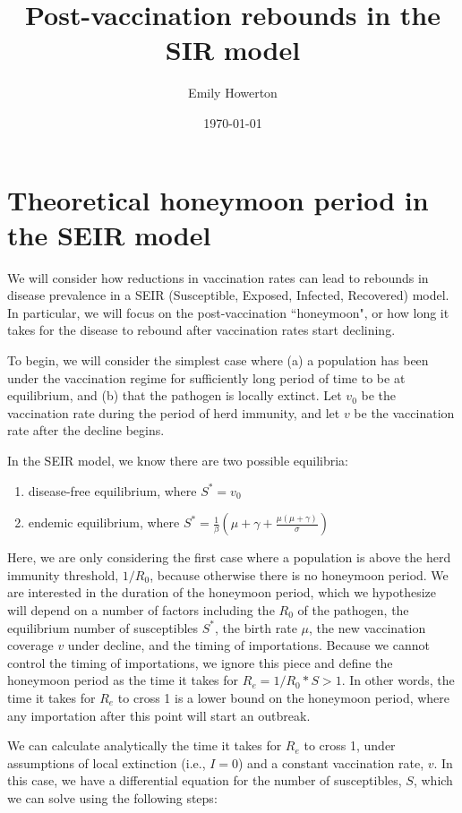 \documentclass[12pt]{article}
\title{Post-vaccination rebounds in the SIR model}
\author{Emily Howerton}
\date{\today}
\begin{document}
\maketitle


\section{Theoretical honeymoon period in the SEIR model}
We will consider how reductions in vaccination rates can lead to rebounds in disease prevalence in a SEIR (Susceptible, Exposed, Infected, Recovered) model. In particular, we will focus on the post-vaccination ``honeymoon", or how long it takes for the disease to rebound after vaccination rates start declining.

To begin, we will consider the simplest case where (a) a population has been under the vaccination regime for sufficiently long period of time to be at equilibrium, and (b) that the pathogen is locally extinct.  Let $v_0$ be the vaccination rate during the period of herd immunity, and let $v$ be the vaccination rate after the decline begins. 

In the SEIR model, we know there are two possible equilibria: 
\begin{enumerate}
    \item disease-free equilibrium, where $S^* = v_0$
    \item endemic equilibrium, where $S^* = \frac{1}{\beta}(\mu + \gamma + \frac{\mu(\mu + \gamma)}{\sigma})$
\end{enumerate}

Here, we are only considering the first case where a population is above the herd immunity threshold, $1/R_0$, because otherwise there is no honeymoon period. We are interested in the duration of the honeymoon period, which we hypothesize will depend on a number of factors including the $R_0$ of the pathogen, the equilibrium number of susceptibles $S^*$, the birth rate $\mu$, the new vaccination coverage $v$ under decline, and  the timing of importations. Because we cannot control the timing of importations, we ignore this piece and define the honeymoon period as the time it takes for $R_e = 1/R_0*S > 1$. In other words, the time it takes for $R_e$ to cross 1 is a lower bound on the honeymoon period, where any importation after this point will start an outbreak. 

We can calculate analytically the time it takes for $R_e$ to cross 1, under assumptions of local extinction (i.e., $I = 0$) and a constant vaccination rate, $v$. In this case, we have a differential equation for the number of susceptibles, $S$, which we can solve using the following steps:
\end{document}
